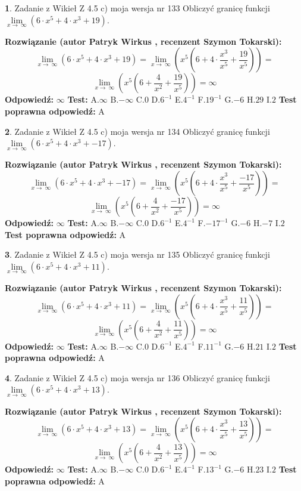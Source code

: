 \documentclass[12pt, a4paper]{article}
\theoremstyle{definition} %
\newtheorem{zad}{}
\newcommand{\zadStart}[1]{\begin{zad}#1\newline}
\newcommand{\zadStop}{\end{zad}}
\newcommand{\rozwStart}[2]{\noindent \textbf{Rozwiązanie (autor #1 , recenzent #2): }\newline}
\newcommand{\rozwStop}{\newline}
\newcommand{\odpStart}{\noindent \textbf{Odpowiedź:}\newline}
\newcommand{\odpStop}{\newline}
\newcommand{\testStart}{\noindent \textbf{Test:}\newline}
\newcommand{\testStop}{\newline}
\newcommand{\kluczStart}{\noindent \textbf{Test poprawna odpowiedź:}\newline}
\newcommand{\kluczStop}{\newline}
\begin{document}
\zadStart{Zadanie z Wikieł Z 4.5 c) moja wersja nr 133}
Obliczyć granicę funkcji  $\lim\limits_{x\to\ \infty}(6 \cdot x^{5}+4 \cdot x^{3}+19)$.
\zadStop
\rozwStart{Patryk Wirkus}{Szymon Tokarski}
$$\lim\limits_{x\to\ \infty}(6 \cdot x^{5}+4 \cdot x^{3}+19) = \lim\limits_{x\to\ \infty}(x^{5}(6 +4 \cdot \frac{x^{3}}{x^{5}}+\frac{19}{x^{5}})) =$$ $$\lim\limits_{x\to\ \infty}(x^{5}(6 +\frac{4}{x^{2}}+\frac{19}{x^{5}})) =\infty$$
\rozwStop
\odpStart
$\infty$
\odpStop
\testStart
A.$\infty$ B.$-\infty$ C.$0$ D.$6^{-1}$ E.$4^{-1}$
F.$19^{-1}$ G.$-6$
H.$29$
I.$2$
\testStop
\kluczStart
A
\kluczStop



\zadStart{Zadanie z Wikieł Z 4.5 c) moja wersja nr 134}
Obliczyć granicę funkcji  $\lim\limits_{x\to\ \infty}(6 \cdot x^{5}+4 \cdot x^{3}+-17)$.
\zadStop
\rozwStart{Patryk Wirkus}{Szymon Tokarski}
$$\lim\limits_{x\to\ \infty}(6 \cdot x^{5}+4 \cdot x^{3}+-17) = \lim\limits_{x\to\ \infty}(x^{5}(6 +4 \cdot \frac{x^{3}}{x^{5}}+\frac{-17}{x^{5}})) =$$ $$\lim\limits_{x\to\ \infty}(x^{5}(6 +\frac{4}{x^{2}}+\frac{-17}{x^{5}})) =\infty$$
\rozwStop
\odpStart
$\infty$
\odpStop
\testStart
A.$\infty$ B.$-\infty$ C.$0$ D.$6^{-1}$ E.$4^{-1}$
F.$-17^{-1}$ G.$-6$
H.$-7$
I.$2$
\testStop
\kluczStart
A
\kluczStop



\zadStart{Zadanie z Wikieł Z 4.5 c) moja wersja nr 135}
Obliczyć granicę funkcji  $\lim\limits_{x\to\ \infty}(6 \cdot x^{5}+4 \cdot x^{3}+11)$.
\zadStop
\rozwStart{Patryk Wirkus}{Szymon Tokarski}
$$\lim\limits_{x\to\ \infty}(6 \cdot x^{5}+4 \cdot x^{3}+11) = \lim\limits_{x\to\ \infty}(x^{5}(6 +4 \cdot \frac{x^{3}}{x^{5}}+\frac{11}{x^{5}})) =$$ $$\lim\limits_{x\to\ \infty}(x^{5}(6 +\frac{4}{x^{2}}+\frac{11}{x^{5}})) =\infty$$
\rozwStop
\odpStart
$\infty$
\odpStop
\testStart
A.$\infty$ B.$-\infty$ C.$0$ D.$6^{-1}$ E.$4^{-1}$
F.$11^{-1}$ G.$-6$
H.$21$
I.$2$
\testStop
\kluczStart
A
\kluczStop



\zadStart{Zadanie z Wikieł Z 4.5 c) moja wersja nr 136}
Obliczyć granicę funkcji  $\lim\limits_{x\to\ \infty}(6 \cdot x^{5}+4 \cdot x^{3}+13)$.
\zadStop
\rozwStart{Patryk Wirkus}{Szymon Tokarski}
$$\lim\limits_{x\to\ \infty}(6 \cdot x^{5}+4 \cdot x^{3}+13) = \lim\limits_{x\to\ \infty}(x^{5}(6 +4 \cdot \frac{x^{3}}{x^{5}}+\frac{13}{x^{5}})) =$$ $$\lim\limits_{x\to\ \infty}(x^{5}(6 +\frac{4}{x^{2}}+\frac{13}{x^{5}})) =\infty$$
\rozwStop
\odpStart
$\infty$
\odpStop
\testStart
A.$\infty$ B.$-\infty$ C.$0$ D.$6^{-1}$ E.$4^{-1}$
F.$13^{-1}$ G.$-6$
H.$23$
I.$2$
\testStop
\kluczStart
A
\kluczStop
\end{document}
